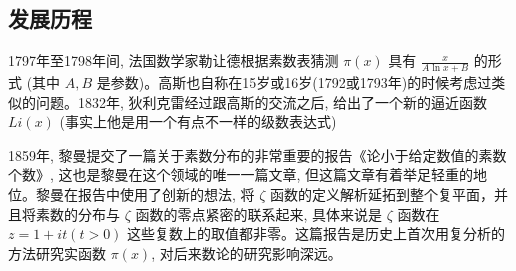 \documentclass[main]{subfiles}
\begin{document}
\subsection{发展历程}
1797年至1798年间, 法国数学家勒让德根据素数表猜测 $\pi (x)$ 具有 $\frac{x}{A\ln x + B}$ 的形式 (其中 $A,B$ 是参数)。高斯也自称在15岁或16岁(1792或1793年)的时候考虑过类似的问题。1832年, 狄利克雷经过跟高斯的交流之后, 给出了一个新的逼近函数 $Li(x)$ (事实上他是用一个有点不一样的级数表达式)
\par 1859年, 黎曼提交了一篇关于素数分布的非常重要的报告《论小于给定数值的素数个数》, 这也是黎曼在这个领域的唯一一篇文章, 但这篇文章有着举足轻重的地位。黎曼在报告中使用了创新的想法, 将
 $\zeta$ 函数的定义解析延拓到整个复平面，并且将素数的分布与
 $\zeta$ 函数的零点紧密的联系起来, 具体来说是 $\zeta $ 函数在 $z = 1 + it (t>0)$ 这些复数上的取值都非零。这篇报告是历史上首次用复分析的方法研究实函数 $\pi(x)$, 对后来数论的研究影响深远。
\end{document}
